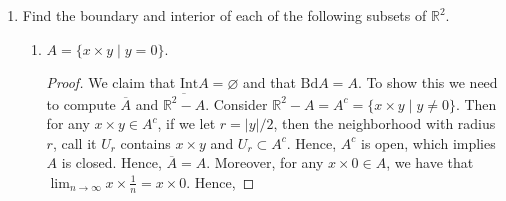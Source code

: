 \documentclass[12pt]{article}
\theoremstyle{definition}
\newcommand{\abs}[1]{\lvert #1 \rvert}
\begin{document}
\begin{enumerate}
\begin{enumerate}[label=(\alph*)]
\begin{proof}
                        $x\in U'=\overline{U}-U$ and this implies $x\notin U$. 
                        Hence, every point of $U$ is an interior point. 
                        Therefore, $U$ is open. 
                    \end{proof}
                \item If $U$ is open, is it true that $U=\text{Int}(\overline{U})$? Justify your answer.
                    \begin{proof}
                        This is not true. Suppose $A$ is open. Then $A\subset\text{Int}A$, 
                        since the interior is the union of all open sets 
                        containing $A$. By definition of interior, we also 
                        have that $\text{Int}A\subset A$. Thus if $A$ 
                        is open, then $A=\text{Int}A$. Now the question is, 
                        if $A$ is open does $\text{Int}A=\text{Int}(\overline{A})$. 
                        For a counter example, consider the set 
                        $A=(-1,0)\cup(0,1)$. We have that $A$ is open and 
                        that $\text{Int}A=A$. However, $\overline{A}=[-1,1]$ 
                        and so $\text{Int}(\overline{A})=(-1,1)$. Thus the two sets 
                        are not equal.
                    \end{proof}
            \end{enumerate}
        \item Find the boundary and interior of each of the following subsets of $\mathbb{R}^2$.
            \begin{enumerate}[label=(\alph*)]
                \item $A=\{x\times y\mid y=0\}$.
                    \begin{proof}
                        We claim that $\text{Int}A=\varnothing$ and that
                        $\text{Bd}A = A$. To show this we need to compute
                        $\overline{A}$ and $\overline{\mathbb{R}^2-A}$.
                        Consider $\mathbb{R}^2-A=A^c=\{x\times y\mid y\neq 0\}$.
                        Then for any $x\times y\in A^c$, if we let
                        $r=\abs{y}/2$, then the neighborhood with radius $r$,
                        call it $U_r$ contains $x\times y$ and $U_r\subset A^c$. 
                        Hence, $A^c$ is open, which implies $A$ is
                        closed. Hence, $\overline{A}=A$. Moreover, for any
                        $x\times 0\in A$, we have that
                        $\lim_{n\to\infty}x\times\frac{1}{n}=x\times 0$. Hence,

\end{proof}
\end{enumerate}
\end{enumerate}
\end{document}
